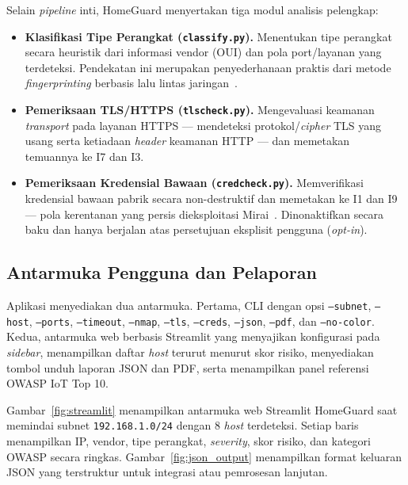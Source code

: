 \documentclass[conference]{IEEEtran}
\begin{document}
Selain \textit{pipeline} inti, HomeGuard menyertakan tiga modul analisis
pelengkap:
\begin{itemize}
  \item \textbf{Klasifikasi Tipe Perangkat (\texttt{classify.py}).}
        Menentukan tipe perangkat secara heuristik dari informasi vendor
        (OUI) dan pola port/layanan yang terdeteksi. Pendekatan ini
        merupakan penyederhanaan praktis dari metode
        \textit{fingerprinting} berbasis lalu lintas
        jaringan~\cite{sivanathan2019}.
  \item \textbf{Pemeriksaan TLS/HTTPS (\texttt{tlscheck.py}).}
        Mengevaluasi keamanan \textit{transport} pada layanan HTTPS ---
        mendeteksi protokol/\textit{cipher} TLS yang usang serta
        ketiadaan \textit{header} keamanan HTTP --- dan memetakan
        temuannya ke I7 dan I3.
  \item \textbf{Pemeriksaan Kredensial Bawaan (\texttt{credcheck.py}).}
        Memverifikasi kredensial bawaan pabrik secara non-destruktif dan
        memetakan ke I1 dan I9 --- pola kerentanan yang persis
        dieksploitasi Mirai~\cite{antonakakis2017}. Dinonaktifkan secara
        baku dan hanya berjalan atas persetujuan eksplisit pengguna
        (\textit{opt-in}).
\end{itemize}

\subsection{Antarmuka Pengguna dan Pelaporan}

Aplikasi menyediakan dua antarmuka. Pertama, CLI dengan opsi
\texttt{--subnet}, \texttt{--host}, \texttt{--ports}, \texttt{--timeout},
\texttt{--nmap}, \texttt{--tls}, \texttt{--creds}, \texttt{--json},
\texttt{--pdf}, dan \texttt{--no-color}. Kedua, antarmuka web berbasis
Streamlit yang menyajikan konfigurasi pada \textit{sidebar}, menampilkan
daftar \textit{host} terurut menurut skor risiko, menyediakan tombol unduh
laporan JSON dan PDF, serta menampilkan panel referensi OWASP IoT Top 10.

Gambar~\ref{fig:streamlit} menampilkan antarmuka web Streamlit HomeGuard
saat memindai subnet \texttt{192.168.1.0/24} dengan 8 \textit{host}
terdeteksi. Setiap baris menampilkan IP, vendor, tipe perangkat,
\textit{severity}, skor risiko, dan kategori OWASP secara ringkas.
Gambar~\ref{fig:json_output} menampilkan format keluaran JSON yang
terstruktur untuk integrasi atau pemrosesan lanjutan.
\end{document}
